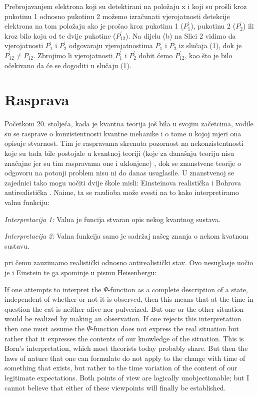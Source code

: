 \documentclass[twoside]{article}
\begin{document}
\begin{enumerate}[label={(\arabic*)}]
Prebrojavanjem elektrona koji su detektirani na položaju x i koji su prošli kroz pukotinu 1 odnosno pukotinu 2 možemo izračunati vjerojatnosti detekcije elektrona na tom položaju ako je prošao kroz pukotinu 1 ($P_1^{'}$), pukotinu 2 ($P_2^{'}$) ili kroz bilo koju od te dvije pukotine ($P_{12}^{'}$). Na dijelu (b) na Slici 2 vidimo da vjerojatnosti $P_1^{'}$ i $P_2^{'}$ odgovaraju vjerojatnostima $P_1$ i $P_2$ iz slučaja (1), dok je $P_{12}^{'} \neq P_{12}$. Zbrojimo li vjerojatnosti $P_1^{'}$ i $P_2^{'}$ dobit ćemo $P_{12}^{'}$, kao što je bilo očekivano da će se dogoditi u slučaju (1).

\end{enumerate}

\section{Rasprava}
Početkom 20. stoljeća, kada je kvantna teorija još bila u svojim začetcima, vodile su se rasprave o konzistentnosti kvantne mehanike i o tome u kojoj mjeri ona opisuje stvarnost. Tim je raspravama skrenuta pozornost na nekonzistentnosti koje su tada bile postojale u kvantnoj teoriji (koje za današnju teoriju nisu značajne jer su tim raspravama one i uklonjene) \cite{Cushing2006}, dok se znanstvene teorije o odgovoru na potonji problem nisu ni do danas usuglasile. U znanstvenoj se zajednici tako mogu uočiti dvije škole misli: Einsteinova realistička i Bohrova antirealistička \cite{Cushing2006}. Naime, ta se razdioba može svesti na to kako interpretiramo valnu funkciju:
\begin{displayquote}
\emph{Interpretacija 1:} Valna je funcija stvaran opis nekog kvantnog sustava.

\emph{Interpretacija 2:} Valna funkcija samo je sadržaj našeg znanja o nekom kvatnom sustavu.
\end{displayquote}
pri čemu zauzimamo realistički odnosno antirealistički stav. Ovo nesuglasje uočio je i Einstein te ga spominje u pismu Heisenbergu:

\begin{displayquote}
If one attempts to interpret the $\Psi$-function as a complete description of a state, independent of whether or not it is observed, then this means that at the time in question the cat is neither alive nor pulverized. But one or the other situation would be realized by making an observation. If one rejects this interpretation then one must assume the $\Psi$-function does not express the real situation but rather that it expresses the contents of our knowledge of the situation. This is Born's interpretation, which most theorists today probably share. But then the laws of nature that one can formulate do not apply to the change with time of something that exists, but rather to the time variation of the content of our legitimate expectations. Both points of view are logically unobjectionable; but I cannot believe that either of these viewpoints will finally be established.\cite{Przibram1967}
\end{displayquote}
\end{document}
